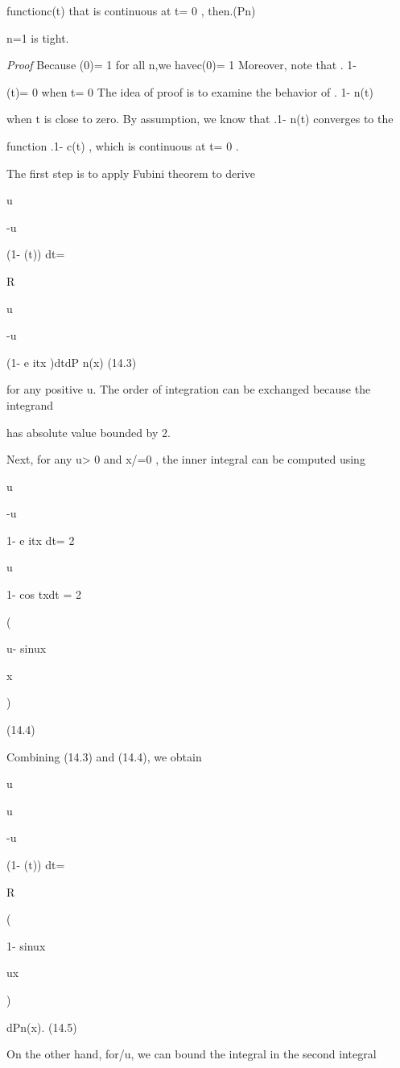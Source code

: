 functionc(t) that is continuous at t= 0 , then.(Pn)\infty

n=1 is tight.

\textit{Proof} Because \phin(0)= 1 for all n,we havec(0)= 1 Moreover, note that . 1-

\phin(t)= 0 when t= 0 The idea of proof is to examine the behavior of . 1- \phi n(t)

when t is close to zero. By assumption, we know that .1- \phi n(t) converges to the

function .1- c(t) , which is continuous at t= 0 .

The first step is to apply Fubini theorem to derive

\int u

-u

(1- \phin(t)) dt=

\int

R

\int u

-u

(1- e itx )dtdP n(x) (14.3)

for any positive u. The order of integration can be exchanged because the integrand

has absolute value bounded by 2.

Next, for any u> 0 and x/=0 , the inner integral can be computed using

\int u

-u

1- e itx dt= 2

\int u

1- cos txdt = 2

(

u- sinux

x

)

(14.4)

Combining (14.3) and (14.4), we obtain

u

\int u

-u

(1- \phin(t)) dt=

\int

R

(

1- sinux

ux

)

dPn(x). (14.5)

On the other hand, for\vertx\vert{}/u, we can bound the integral in the second integral

